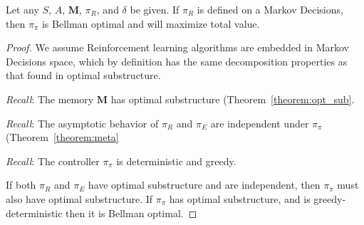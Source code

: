 \begin{theorem} \label{theorem:meta_total} 
    \label{theorem:meta} 
	 Let any $S$, $A$, $\mathbf{M}$, $\pi_R$, and $\delta$ be given. If $\pi_R$ is defined on a Markov Decisions, then $\pi_\pi$ is Bellman optimal and will maximize total value. 
\end{theorem}
\begin{proof}
    We assume Reinforcement learning algorithms are embedded in Markov Decisions space, which by definition has the same decomposition properties as that found in optimal substructure.
    
    \textit{Recall}: The memory $\mathbf{M}$ has optimal substructure (Theorem~\ref{theorem:opt_sub}.
    
	\textit{Recall}: The asymptotic behavior of $\pi_R$ and $\pi_E$ are independent under $\pi_\pi$ (Theorem~\ref{theorem:meta}
	
	\textit{Recall}: The controller $\pi_\pi$ is deterministic and greedy.
	
	If both $\pi_R$ and $\pi_E$ have optimal substructure and are independent, then $\pi_\pi$ must also have optimal substructure. If $\pi_\pi$ has optimal substructure, and is greedy-deterministic then it is Bellman optimal.
\end{proof}
